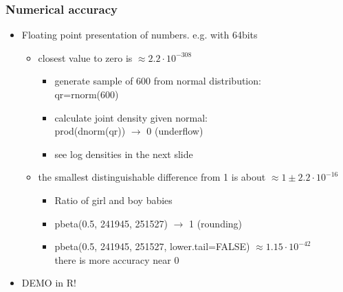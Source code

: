 \documentclass[10pt]{beamer}
\begin{document}
\begin{frame}

\frametitle{Numerical accuracy}

  \begin{itemize}
  \item Floating point presentation of numbers. e.g. with 64bits
    \begin{itemize}
    \item closest value to zero is $\approx 2.2\cdot 10^{-308}$
      \begin{itemize}
      \item generate sample of 600 from normal distribution:\\
        {\color{uured} qr=rnorm(600)}
      \item calculate joint density given normal:\\
        {\color{uured} prod(dnorm(qr)) $\rightarrow$} {\color{red} 0 (underflow)}
      \item<2-> see log densities in the next slide
      \end{itemize}
    \item<3-> the smallest distinguishable difference from 1 is about $\approx 1 \pm  2.2\cdot 10^{-16}$
      \begin{itemize}
      \item<3-> Ratio of girl and boy babies
      \item<3-> {\color{uured} pbeta(0.5, 241945, 251527) $\rightarrow$} {\color{red}  1 (rounding)}
      \item<4-> {\color{uured} pbeta(0.5, 241945, 251527, lower.tail=FALSE) $\approx 1.15\cdot 10^{-42}$}\\
        there is more accuracy near 0
      \end{itemize}
    \end{itemize}
    \item<5->DEMO in R!
  \end{itemize}

\end{frame}
\end{document}
